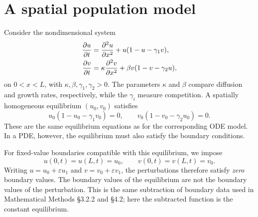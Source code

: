 \documentclass[main.tex]{subfiles}
\begin{document}
\section{A spatial population model}
Consider the nondimensional system
\begin{align}\label{merged:population}
\pd{u}{t}&=\pdd{u}{x}+u(1-u-\gamma_1v),\\
\pd{v}{t}&=\kappa\pdd{v}{x}+\beta v(1-v-\gamma_2u),
\end{align}
on $0<x<L$, with $\kappa,\beta,\gamma_1,\gamma_2>0$. The parameters $\kappa$ and $\beta$ compare diffusion and growth rates, respectively, while the $\gamma_i$ measure competition. A spatially homogeneous equilibrium $(u_0,v_0)$ satisfies
\begin{equation}
u_0(1-u_0-\gamma_1v_0)=0,\qquad
v_0(1-v_0-\gamma_2u_0)=0.
\end{equation}
These are the same equilibrium equations as for the corresponding ODE model. In a PDE, however, the equilibrium must also satisfy the boundary conditions.

For fixed-value boundaries compatible with this equilibrium, we impose
\begin{equation}
u(0,t)=u(L,t)=u_0,\qquad v(0,t)=v(L,t)=v_0.
\end{equation}
Writing $u=u_0+\varepsilon u_1$ and $v=v_0+\varepsilon v_1$, the perturbations therefore satisfy \emph{zero} boundary values. The boundary values of the equilibrium are not the boundary values of the perturbation. This is the same subtraction of boundary data used in Mathematical Methods \S3.2.2 and \S4.2; here the subtracted function is the constant equilibrium.
\end{document}

